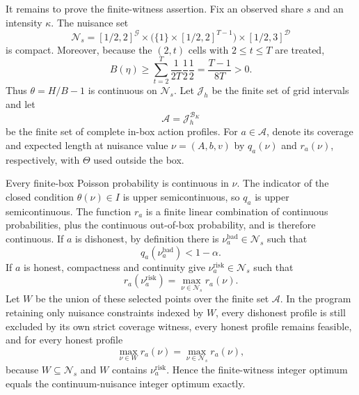 It remains to prove the finite-witness assertion.  Fix an observed share \(s\) and an intensity \(\kappa\).  The nuisance set
\[
 \mathcal N_s=[1/2,2]^{\mathcal G}
 \times\bigl(\{1\}\times[1/2,2]^{T-1}\bigr)
 \times[1/2,3]^{\mathcal D}
\]
is compact.  Moreover, because the \((2,t)\) cells with \(2\le t\le T\) are treated,
\[
 B(\eta)\ge \sum_{t=2}^T
 \frac1{2T}\frac12\frac12
 =\frac{T-1}{8T}>0.
\]
Thus \(\theta=H/B-1\) is continuous on \(\mathcal N_s\).  Let \(\mathcal J_h\) be the finite set of grid intervals and let
\[
 \mathcal A=\mathcal J_h^{\mathcal B_K}
\]
be the finite set of complete in-box action profiles.  For \(a\in\mathcal A\), denote its coverage and expected length at nuisance value \(\nu=(A,b,v)\) by \(q_a(\nu)\) and \(r_a(\nu)\), respectively, with \(\Theta\) used outside the box.

Every finite-box Poisson probability is continuous in \(\nu\).  The indicator of the closed condition \(\theta(\nu)\in I\) is upper semicontinuous, so \(q_a\) is upper semicontinuous.  The function \(r_a\) is a finite linear combination of continuous probabilities, plus the continuous out-of-box probability, and is therefore continuous.  If \(a\) is dishonest, by definition there is \(\nu_a^{\mathrm{bad}}\in\mathcal N_s\) such that
\[
 q_a(\nu_a^{\mathrm{bad}})<1-\alpha.
\]
If \(a\) is honest, compactness and continuity give \(\nu_a^{\mathrm{risk}}\in\mathcal N_s\) such that
\[
 r_a(\nu_a^{\mathrm{risk}})=\max_{\nu\in\mathcal N_s}r_a(\nu).
\]
Let \(W\) be the union of these selected points over the finite set \(\mathcal A\).  In the program retaining only nuisance constraints indexed by \(W\), every dishonest profile is still excluded by its own strict coverage witness, every honest profile remains feasible, and for every honest profile
\[
 \max_{\nu\in W}r_a(\nu)
 =\max_{\nu\in\mathcal N_s}r_a(\nu),
\]
because \(W\subseteq\mathcal N_s\) and \(W\) contains \(\nu_a^{\mathrm{risk}}\).  Hence the finite-witness integer optimum equals the continuum-nuisance integer optimum exactly.

